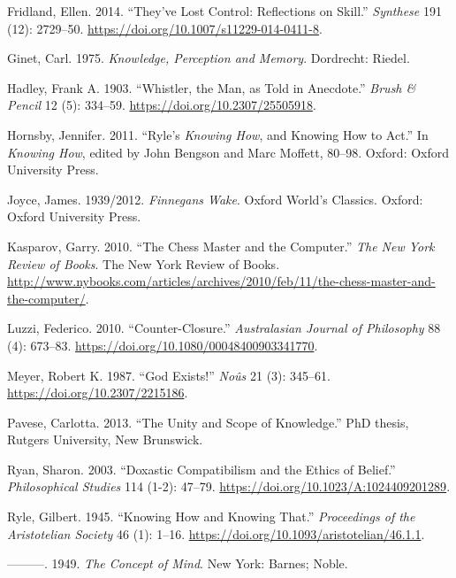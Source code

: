 \documentclass[
  11pt,
  letterpaper,
  DIV=11,
  numbers=noendperiod,
  oneside]{scrartcl}
\newlength{\cslhangindent}
\newenvironment{CSLReferences}[2] %
 {\begin{list}{}{%
  \setlength{\itemindent}{0pt}
  \setlength{\leftmargin}{0pt}
  \setlength{\parsep}{0pt}
  \ifodd #1
   \setlength{\leftmargin}{\cslhangindent}
   \setlength{\itemindent}{-1\cslhangindent}
  \fi
  \setlength{\itemsep}{#2\baselineskip}}}
 {\end{list}}
\begin{document}
\begin{CSLReferences}{1}{0}
Fridland, Ellen. 2014. {``They've Lost Control: Reflections on Skill.''}
\emph{Synthese} 191 (12): 2729--50.
\url{https://doi.org/10.1007/s11229-014-0411-8}.

Ginet, Carl. 1975. \emph{Knowledge, Perception and Memory}. Dordrecht:
Riedel.

Hadley, Frank A. 1903. {``Whistler, the Man, as Told in Anecdote.''}
\emph{Brush \& Pencil} 12 (5): 334--59.
\url{https://doi.org/10.2307/25505918}.

Hornsby, Jennifer. 2011. {``Ryle's \emph{Knowing How}, and Knowing How
to Act.''} In \emph{Knowing How}, edited by John Bengson and Marc
Moffett, 80--98. Oxford: Oxford University Press.

Joyce, James. 1939/2012. \emph{Finnegans Wake}. Oxford World's Classics.
Oxford: Oxford University Press.

Kasparov, Garry. 2010. {``The Chess Master and the Computer.''}
\emph{The New York Review of Books}. The New York Review of Books.
\url{http://www.nybooks.com/articles/archives/2010/feb/11/the-chess-master-and-the-computer/}.

Luzzi, Federico. 2010. {``Counter-Closure.''} \emph{Australasian Journal
of Philosophy} 88 (4): 673--83.
\url{https://doi.org/10.1080/00048400903341770}.

Meyer, Robert K. 1987. {``God Exists!''} \emph{No{û}s} 21 (3): 345--61.
\url{https://doi.org/10.2307/2215186}.

Pavese, Carlotta. 2013. {``The Unity and Scope of Knowledge.''} PhD
thesis, Rutgers University, New Brunswick.

Ryan, Sharon. 2003. {``Doxastic Compatibilism and the Ethics of
Belief.''} \emph{Philosophical Studies} 114 (1-2): 47--79.
\url{https://doi.org/10.1023/A:1024409201289}.

Ryle, Gilbert. 1945. {``Knowing How and Knowing That.''}
\emph{Proceedings of the Aristotelian Society} 46 (1): 1--16.
\url{https://doi.org/10.1093/aristotelian/46.1.1}.

---------. 1949. \emph{The Concept of Mind}. New York: Barnes; Noble.


\end{CSLReferences}
\end{document}
